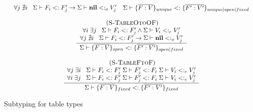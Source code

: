 \documentclass[preprint]{sigplanconf}
\newcommand{\Nil}{\mathbf{nil}}
\newcommand{\mylabel}[1]{\; (\textsc{#1})}
\newcommand{\senv}{\Sigma}
\newcommand{\subtype}{<:}
\begin{document}
\begin{figure}[t]
\[\begin{array}{c}
\begin{array}{c}
{\begin{array}{c}
	\forall j  \; \nexists i \;\;\;
	\senv \vdash F_{i} \subtype F_{j}' \to \senv \vdash \Nil \subtype_{o} V_{j}'
	\end{array}}
{\begin{array}{c}
	\senv \vdash \{\overline{F:V}\}_{unique} \subtype
	\{\overline{F^\prime:V^\prime}\}_{unique|open|fixed}
	\end{array}}
\end{array}\\\\
\begin{array}{c}
\mylabel{S-TableOtoOF}\\
\dfrac{\begin{array}{c}
	\forall i \; \exists j \;\;\;
	\senv \vdash F_{i} \subtype F_{j}' \land \senv \vdash V_{i} \subtype_{c} V_{j}' \\
	\forall j \; \nexists i \;\;\;
	\senv \vdash F_{i} \subtype F_{j}' \to \senv \vdash \Nil \subtype_{o} V_{j}'
	\end{array}}
{\begin{array}{c}
	\senv \vdash \{\overline{F:V}\}_{open} \subtype
	\{\overline{F^\prime:V^\prime}\}_{open|fixed}
	\end{array}}
\end{array}\\\\
\begin{array}{c}
\mylabel{S-TableFtoF}\\
\dfrac{\begin{array}{c}
	\forall j \; \exists i \;\;\;
	\senv \vdash F_{i} \subtype F_{j}' \;
	\senv \vdash F_{j}' \subtype F_{i} \;
	\senv \vdash V_{i} \subtype_{c} V_{j}'\\
	\forall i \; \exists j \;\;\;
	\senv \vdash F_{i} \subtype F_{j}' \;
	\senv \vdash F_{j}' \subtype F_{i} \;
	\senv \vdash V_{i} \subtype_{c} V_{j}'\\
	\end{array}}
{\senv \vdash \{\overline{F:V}\}_{fixed} \subtype
	\{\overline{F^\prime:V^\prime}\}_{fixed}}
\end{array}
\end{array}
\]
\caption{Subtyping for table types}
\label{fig:tablesub}
\end{figure}
\end{document}
